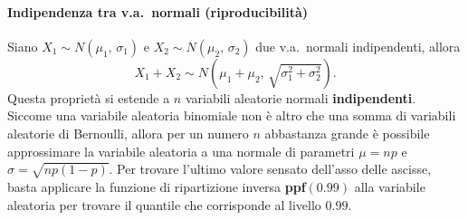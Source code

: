 \paragraph{Indipendenza tra v.a.\ normali (riproducibilità)}
Siano $X_1 \sim N{(\mu_1, \, \sigma_1)}$ e $X_2 \sim N{(\mu_2, \, \sigma_2)}$ due v.a.\ normali indipendenti, allora \[
X_1 + X_2 \sim N{\left(\mu_1 + \mu_2, \, \sqrt{\sigma_1^2 + \sigma_2 ^2}\right)}.\]
Questa proprietà si estende a $n$ variabili aleatorie normali \textbf{indipendenti}.
\newline \newline
Siccome una variabile aleatoria binomiale non è altro che una somma di variabili aleatorie di Bernoulli, allora per un numero $n$ abbastanza grande è possibile approssimare la variabile aleatoria a una normale di parametri $\mu = np$ e $\sigma = \sqrt{np(1-p)}$.
\newline \newline
Per trovare l'ultimo valore sensato dell'asso delle ascisse, basta applicare la funzione di ripartizione inversa \textbf{ppf}$(0.99)$ alla variabile aleatoria per trovare il quantile che corrisponde al livello $0.99$.

